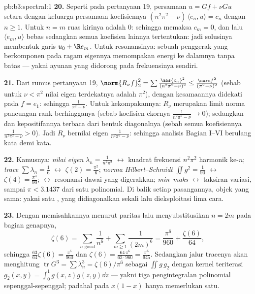 \begin{solution}{pb:b3:spectral:1}
\textbf{20.} Seperti pada pertanyaan 19, persamaan $u = Gf + \nu
Gu$ setara dengan keluarga persamaan koefisiennya
$(n^2\pi^2 - \nu)\,\langle e_n, u\rangle = c_n$ dengan $n \geq
1$. Untuk $n = m$ ruas kirinya adalah
$0$: sehingga  memaksa $c_m = 0$, dan lalu $\langle e_m,
u\rangle$ bebas sedangkan semua koefisien lainnya
tertentukan: jadi solusinya membentuk garis $u_0 + \R e_m$.
Untuk resonansinya: sebuah penggerak yang berkomponen pada ragam eigennya
memompakan energi ke dalamnya tanpa batas --- yakni ayunan yang didorong pada
frekuensinya sendiri.

\textbf{21.} Dari rumus pertanyaan 19, $\norm{R_\nu f}_2^2
= \sum\frac{\abs{c_n}^2}{(n^2\pi^2 - \nu)^2} \leq
\frac{\norm f^2}{(\pi^2 - \nu)^2}$ (sebab untuk $\nu < \pi^2$
nilai eigen terdekatnya adalah $\pi^2$), dengan kesamaannya didekati pada
$f = e_1$: sehingga  $\frac1{\pi^2 - \nu}$. Untuk kekompakannya:
$R_\nu$ merupakan limit norma pancungan rank berhingganya
(sebab koefisien ekornya $\frac1{n^2\pi^2 - \nu} \to 0$);
sedangkan  dan kepositifannya terbaca dari bentuk
diagonalnya (sebab semua koefisiennya $\frac1{n^2\pi^2 - \nu} > 0$).
Jadi $R_\nu$ bernilai eigen $\frac1{n^2\pi^2 - \nu}$: sehingga
analisis Bagian I--VI berulang kata demi kata.

\textbf{22.} Kamusnya: \emph{nilai eigen} $\lambda_n =
\frac1{n^2\pi^2}$ $\leftrightarrow$ kuadrat frekuensi
$n^2\pi^2$ harmonik ke-$n$; \emph{trace} $\sum
\lambda_n = \frac16$ $\leftrightarrow$ $\zeta(2) =
\frac{\pi^2}6$; \emph{norma Hilbert--Schmidt} $\iint g^2 =
\frac1{90}$ $\leftrightarrow$ $\zeta(4) = \frac{\pi^4}{90}$;
\emph{} $\leftrightarrow$ resonansi
dawai yang digerakkan; \emph{min--maks} $\leftrightarrow$
taksiran variasi, sampai $\pi < 3.1437$ dari satu
polinomial. Di balik setiap pasangannya, objek yang sama: yakni satu
 , yang didiagonalkan sekali lalu dieksploitasi
lima cara.

\textbf{23.} Dengan memisahkannya menurut paritas lalu menyubstitusikan $n = 2m$
pada bagian genapnya,
\[
\zeta(6) = \sum_{n\text{ gasal}}\frac1{n^6} +
\sum_{m\geq1}\frac1{(2m)^6}
= \frac{\pi^6}{960} + \frac{\zeta(6)}{64},
\]
sehingga $\frac{63}{64}\zeta(6) = \frac{\pi^6}{960}$ dan $\zeta(6)
= \frac{64\,\pi^6}{63\cdot960} = \frac{\pi^6}{945}$. Sedangkan
jalur tracenya akan menghitung $\operatorname{tr}G^3 =
\sum\lambda_n^3 = \zeta(6)/\pi^6$ sebagai $\iint g\,g_2$ dengan
kernel teriterasi $g_2(x,y) = \int_0^1g(x,z)g(z,y)\dd z$ ---
yakni tiga pengintegralan polinomial sepenggal-sepenggal; padahal  pada
$x(1-x)$ hanya memerlukan satu.


\end{solution}
